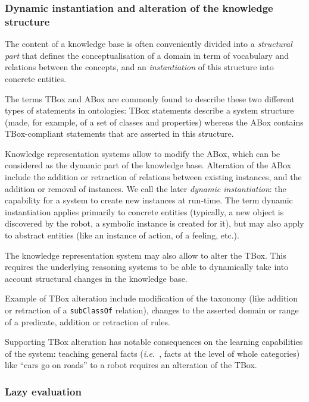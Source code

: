 \documentclass[a4paper, twocolumn]{article}
\newcommand{\ie}{{\textit{i.e.\ }}}
\newcommand{\concept}[1]{{\footnotesize \texttt{#1}}}
\begin{document}
\subsubsection{Dynamic instantiation and alteration of the knowledge structure}

The content of a knowledge base is often conveniently divided into a
\emph{structural part} that defines the conceptualisation of a domain in term
of vocabulary and relations between the concepts, and an \emph{instantiation} of
this structure into concrete entities.

The terms TBox and ABox are commonly found to describe these two different types
of statements in ontologies: TBox statements describe a system structure (made,
for example, of a set of classes and properties) whereas the ABox contains
TBox-compliant statements that are asserted in this structure.

Knowledge representation systems allow to modify the ABox, which can be
considered as the dynamic part of the knowledge base. Alteration of the ABox
include the addition or retraction of relations between existing instances,
and the addition or removal of instances. We call the later \emph{dynamic
instantiation}: the capability for a system to create new instances at
run-time. The term dynamic instantiation applies primarily to concrete entities
(typically, a new object is discovered by the robot, a symbolic instance is
created for it), but may also apply to abstract entities (like an instance of
action, of a feeling, etc.).

The knowledge representation system may also allow to alter the TBox. This
requires the underlying reasoning systems to be able to dynamically take into
account structural changes in the knowledge base.

Example of TBox alteration include modification of the taxonomy (like addition
or retraction of a \concept{subClassOf} relation), changes to the asserted
domain or range of a predicate, addition or retraction of rules.

Supporting TBox alteration has notable consequences on the learning
capabilities of the system: teaching general facts (\ie, facts at the level of
whole categories) like ``cars go on roads'' to a robot requires an alteration
of the TBox.

\subsubsection{Lazy evaluation}
\label{sect|lazy-evaluation}
\end{document}
